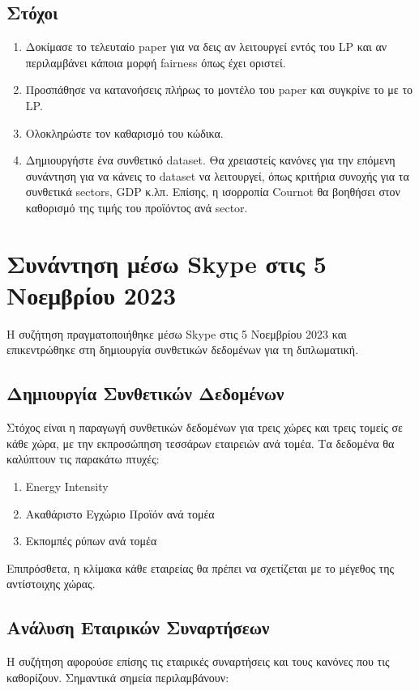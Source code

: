 \documentclass[a4paper,twoside,10pt]{article}
\begin{document}
\subsection{Στόχοι}
\begin{enumerate}
	\item Δοκίμασε το τελευταίο paper για να δεις αν λειτουργεί εντός του LP και αν περιλαμβάνει κάποια μορφή fairness όπως έχει οριστεί.
	\item Προσπάθησε να κατανοήσεις πλήρως το μοντέλο του paper και συγκρίνε το με το LP.
	\item Ολοκληρώστε τον καθαρισμό του κώδικα.
	\item Δημιουργήστε ένα συνθετικό dataset. Θα χρειαστείς κανόνες για την επόμενη συνάντηση για να κάνεις το dataset να λειτουργεί, όπως κριτήρια συνοχής για τα συνθετικά sectors, GDP κ.λπ. Επίσης, η ισορροπία Cournot θα βοηθήσει στον καθορισμό της τιμής του προϊόντος ανά sector.
\end{enumerate}

\section{Συνάντηση μέσω Skype στις 5 Νοεμβρίου 2023}
Η συζήτηση πραγματοποιήθηκε μέσω Skype στις 5 Νοεμβρίου 2023 και επικεντρώθηκε στη δημιουργία συνθετικών δεδομένων για τη διπλωματική.

\subsection{Δημιουργία Συνθετικών Δεδομένων}
Στόχος είναι η παραγωγή συνθετικών δεδομένων για τρεις χώρες και τρεις τομείς σε κάθε χώρα, με την εκπροσώπηση τεσσάρων εταιρειών ανά τομέα. Τα δεδομένα θα καλύπτουν τις παρακάτω πτυχές:

\begin{enumerate}
	\item Energy Intensity
	\item Ακαθάριστο Εγχώριο Προϊόν ανά τομέα
	\item Εκπομπές ρύπων ανά τομέα
\end{enumerate}

Επιπρόσθετα, η κλίμακα κάθε εταιρείας θα πρέπει να σχετίζεται με το μέγεθος της αντίστοιχης χώρας.

\subsection{Ανάλυση Εταιρικών Συναρτήσεων}
Η συζήτηση αφορούσε επίσης τις εταιρικές συναρτήσεις και τους κανόνες που τις καθορίζουν. Σημαντικά σημεία περιλαμβάνουν:
\end{document}
